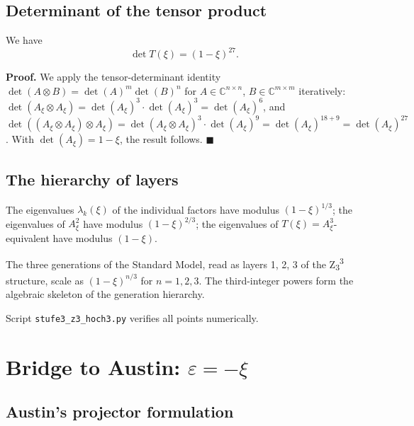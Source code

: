 \subsection{Determinant of the tensor product}

\begin{keyresult}
We have
\begin{equation}
\det T(\xi) = (1 - \xi)^{27}.
\label{eq:detT}
\end{equation}
\end{keyresult}

\noindent\textbf{Proof.} We apply the tensor-determinant identity \(\det(A \otimes B) = \det(A)^m \det(B)^n\) for \(A \in \mathbb{C}^{n \times n}\), \(B \in \mathbb{C}^{m \times m}\) iteratively: \(\det(A_\xi \otimes A_\xi) = \det(A_\xi)^3 \cdot \det(A_\xi)^3 = \det(A_\xi)^6\), and \(\det((A_\xi \otimes A_\xi) \otimes A_\xi) = \det(A_\xi \otimes A_\xi)^3 \cdot \det(A_\xi)^9 = \det(A_\xi)^{18+9} = \det(A_\xi)^{27}\). With \(\det(A_\xi) = 1 - \xi\), the result follows. \(\blacksquare\)

\subsection{The hierarchy of layers}

The eigenvalues \(\lambda_k(\xi)\) of the individual factors have modulus \((1-\xi)^{1/3}\); the eigenvalues of \(A_\xi^2\) have modulus \((1-\xi)^{2/3}\); the eigenvalues of \(T(\xi) = A_\xi^3\)-equivalent have modulus \((1-\xi)\).

\begin{insightBox}
The three generations of the Standard Model, read as layers 1, 2, 3 of the Z\textsubscript{3}\textsuperscript{3} structure, scale as \((1-\xi)^{n/3}\) for \(n = 1, 2, 3\). The third-integer powers form the algebraic skeleton of the generation hierarchy.
\end{insightBox}

Script \texttt{stufe3\_z3\_hoch3.py} verifies all points numerically.

\section[Bridge to Austin: epsilon = -xi]{Bridge to Austin: \texorpdfstring{\(\varepsilon = -\xi\)}{epsilon = -xi}}
\label{sec:austin}

\subsection{Austin's projector formulation}


